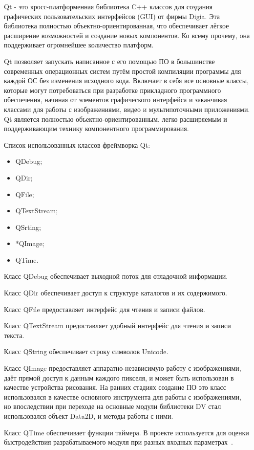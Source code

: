 Qt - это кросс-платформенная библиотека C++ классов для создания графических пользовательских интерфейсов (GUI) от фирмы Digia. Эта библиотека полностью объектно-ориентированная, что обеспечивает лёгкое расширение возможностей и создание новых компонентов. Ко всему прочему, она поддерживает огромнейшее количество платформ.

Qt позволяет запускать написанное с его помощью ПО в большинстве современных операционных систем путём простой компиляции программы для каждой ОС без изменения исходного кода. Включает в себя все основные классы, которые могут потребоваться при разработке прикладного программного обеспечения, начиная от элементов графического интерфейса и заканчивая классами для работы с изображениями, видео и мультипоточными приложениями. Qt является полностью объектно-ориентированным, легко расширяемым и поддерживающим технику компонентного программирования.

Список использованных классов фреймворка Qt:
\begin{itemize}
\item QDebug;
\item QDir;
\item QFile;
\item QTextStream;
\item QSrting;
\item *QImage;
\item QTime.
\end{itemize}

Класс QDebug обеспечивает выходной поток для отладочной информации.

Класс QDir обеспечивает доступ к структуре каталогов и их содержимого.

Класс QFile предоставляет интерфейс для чтения и записи файлов.

Класс QTextStream предоставляет удобный интерфейс для чтения и записи текста.

Класс QString обеспечивает строку символов Unicode.

Класс QImage предоставляет аппаратно-независимую работу с изображениями, даёт прямой доступ к данным каждого пикселя, и может быть использован в качестве устройства рисования. На ранних стадиях создание ПО это класс использовался в качестве основного инструмента для работы с изображениями, но впоследствии при переходе на основные модули библиотеки DV стал использовался объект Data2D, и методы работы с ними.

Класс QTime обеспечивает функции таймера. В проекте используется для оценки быстродействия разрабатываемого модуля при разных входных параметрах~\cite{qt}.

